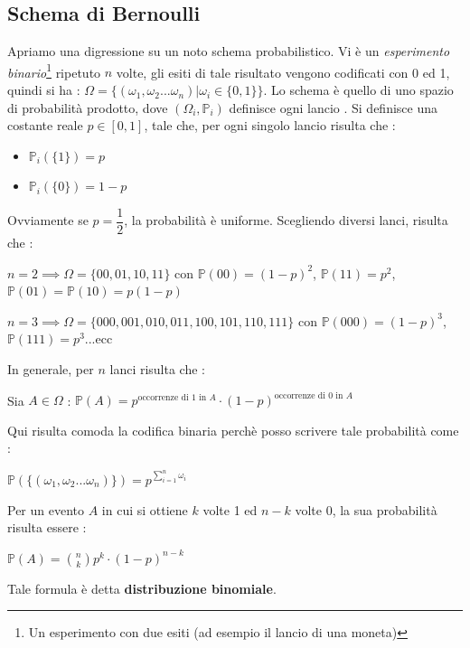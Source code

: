 \documentclass[12pt, letterpaper]{article}
\begin{document}
\subsection{Schema di Bernoulli}\label{schemaBernoulli}
Apriamo una digressione su un noto schema probabilistico. Vi è un \textit{esperimento binario}\footnote{
    Un esperimento con due esiti (ad esempio il lancio di una moneta)
} ripetuto \(n\) volte, gli esiti di tale risultato vengono codificati con 0 ed 1, quindi si ha :
\( \Omega=\{(\omega_1,\omega_2...\omega_n)|\omega_i\in\{0,1\}\} \). Lo schema è quello di uno spazio 
di probabilità prodotto, dove \((\Omega_i,\mathbb{P}_i)\) definisce ogni lancio
. Si definisce una costante reale \(p\in[0,1]\), tale che, per ogni singolo lancio risulta che :\begin{itemize}
    \item \(\mathbb{P}_i(\{1\})=p\)
    \item \(\mathbb{P}_i(\{0\})=1-p\)
\end{itemize}
Ovviamente se \(p=\dfrac{1}{2}\), la probabilità è uniforme. Scegliendo diversi lanci, risulta che :
\begin{center}
   \(n=2\implies \Omega =\{00,01,10,11\}\) con \(\mathbb{P}(00)=(1-p)^2\), \(\mathbb{P}(11)=p^2\), \(\mathbb{P}(01)=\mathbb{P}(10)=p(1-p)\)
\end{center}
\begin{center}
    \(n=3\implies\Omega=\{000,001,010,011,100,101,110,111\}\) con \(\mathbb{P}(000)=(1-p)^3\), \(\mathbb{P}(111)=p^3\)...ecc
\end{center}
In generale, per \(n\) lanci risulta che :\begin{center}
    Sia \(A\in \Omega\) : \(\mathbb{P}(A)=p^{\text{occorrenze di 1 in } A}\cdot (1-p)^{\text{occorrenze di 0 in } A}\)
\end{center}
Qui risulta comoda la codifica binaria perchè posso scrivere tale probabilità come :\begin{center}
    \(\mathbb{P}(\{(\omega_1,\omega_2...\omega_n)\})=\displaystyle p^{\displaystyle \sum^n_{i=1}\omega_i}\)
\end{center}
Per un evento \(A\) in cui si ottiene \(k\) volte 1 ed \(n-k\) volte 0, la sua probabilità risulta 
essere : \begin{center}
    \(\mathbb{P}(A)=\displaystyle\binom{n}{k}p^k\cdot (1-p)^{n-k}\)
\end{center}
Tale formula è detta \textbf{distribuzione binomiale}.
\end{document}
